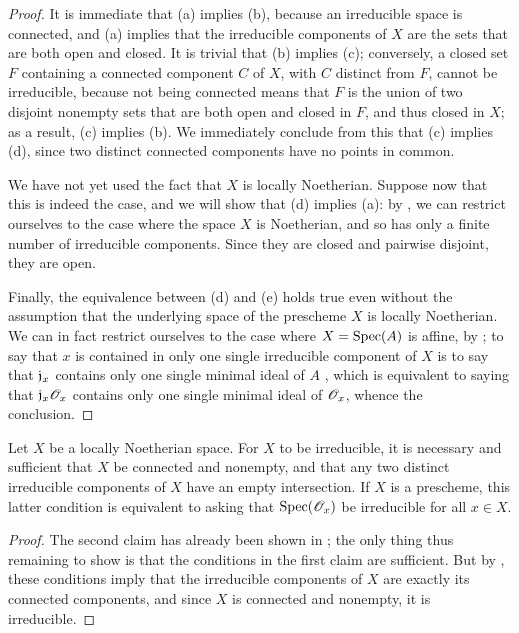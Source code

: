 \begin{proof}
\label{proof-1.6.1.10}
It is immediate that (a) implies (b), because an irreducible space is connected, and (a) implies that the irreducible components of $X$ are the sets that are both open and closed.
It is trivial that (b) implies (c); conversely, a closed set $F$ containing
a connected component $C$ of $X$, with $C$ distinct from $F$, cannot be irreducible, because not being connected means that $F$ is the union of two disjoint nonempty sets that are both open and closed in $F$, and thus closed in $X$; as a result, (c) implies (b).
We immediately conclude from this that (c) implies (d), since two distinct connected components have no points in common.

We have not yet used the fact that $X$ is locally Noetherian.
Suppose now that this is indeed the case, and we will show that (d) implies (a): by , we can restrict ourselves to the case where the space $X$ is Noetherian, and so has only a finite number of irreducible components.
Since they are closed and pairwise disjoint, they are open.

Finally, the equivalence between (d) and (e) holds true even without the assumption that the underlying space of the prescheme $X$ is locally Noetherian.
We can in fact restrict ourselves to the case where $X={\mathop{\mathrm{Spec}}\nolimits}(A)$ is affine, by ;
to say that $x$ is contained in only one single irreducible component of $X$ is to say that $\mathfrak{j}_x$ contains only one single minimal ideal of $A$ , which is equivalent to saying that $\mathfrak{j}_x\mathscr{O}_x$ contains only one single minimal ideal of $\mathscr{O}_x$, whence the conclusion.
\end{proof}

\begin{cor}[6.1.11]
\label{1.6.1.11}
Let $X$ be a locally Noetherian space.
For $X$ to be irreducible, it is necessary and sufficient that $X$ be connected and nonempty, and that any two distinct irreducible components of $X$ have an empty intersection.
If $X$ is a prescheme, this latter condition is equivalent to asking that ${\mathop{\mathrm{Spec}}\nolimits}(\mathscr{O}_x)$ be irreducible for all $x\in X$.
\end{cor}

\begin{proof}
\label{proof-1.6.1.11}
The second claim has already been shown in ;
the only thing thus remaining to show is that the conditions in the first claim are sufficient.
But by , these conditions imply that the irreducible components of $X$ are exactly its connected components, and since $X$ is connected and nonempty, it is irreducible.
\end{proof}

